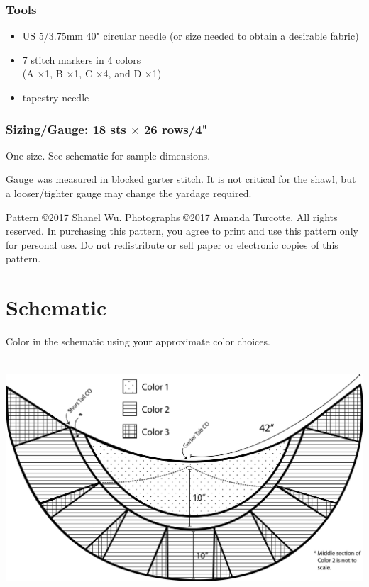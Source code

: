 \documentclass[12pt]{article}
\newcommand{\x}{$\times$}			%
\newenvironment{frnote}
    {%
    	\setlength{\FrameRule}{1.5pt}
    	\def\FrameCommand{\fboxrule=\FrameRule\fboxsep=\FrameSep \fcolorbox{framecolor}{shadecolor}}
    	\MakeFramed {\FrameRestore}}
    {\setlength{\FrameRule}{1pt}
	\endMakeFramed}
\begin{document}
\begin{multicols}{2}
\subsubsection*{Tools}

\begin{itemize}[itemsep=0mm]
\item US 5/3.75mm 40" circular needle (or size needed to obtain a desirable fabric) 
\item 7 stitch markers in 4 colors \\ (A \x 1, B \x 1, C \x 4, and D \x 1)
\item tapestry needle
\end{itemize}

\subsubsection*{Sizing/Gauge: 18 sts \x{} 26 rows/4"}

One size. See schematic for sample dimensions.

Gauge was measured in blocked garter stitch. It is not critical for the shawl, but a looser/tighter gauge may change the yardage required.


\vspace{4.5in}

\begin{frnote} \ssmall
Pattern \copyright 2017 Shanel Wu. Photographs \copyright 2017 Amanda Turcotte. All rights reserved. In purchasing this pattern, you agree to print and use this pattern only for personal use. Do not redistribute or sell paper or electronic copies of this pattern.
\end{frnote}

\end{multicols}

\newpage
\pagestyle{plain}

\section*{Schematic}

Color in the schematic using your approximate color choices.
\begin{center}
\includegraphics[height=3.5in]{schematic4}
\end{center}
\end{document}
